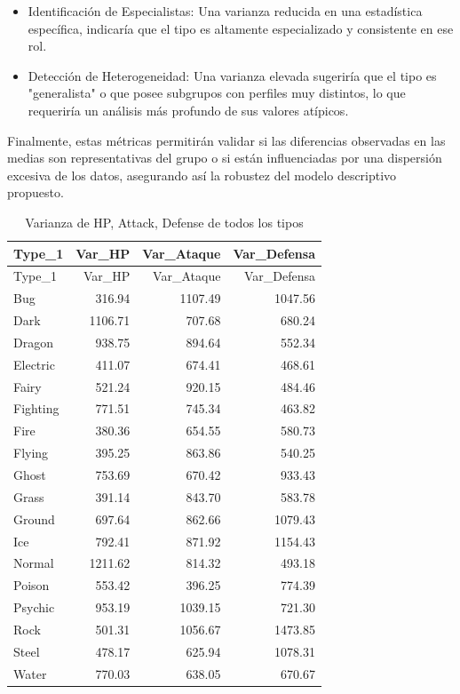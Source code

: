 \documentclass[oneside,11pt]{Latex/Classes/PhDthesisPSnPDF}
\begin{document}
\begin{itemize}

 \item{Identificación de Especialistas: Una varianza reducida en una estadística específica, indicaría que el tipo es altamente especializado y consistente en ese rol.}
 
\item{Detección de Heterogeneidad: Una varianza elevada sugeriría que el tipo es "generalista" o que posee subgrupos con perfiles muy distintos, lo que requeriría un análisis más profundo de sus valores atípicos.} 

\end{itemize}

Finalmente, estas métricas permitirán validar si las diferencias
observadas en las medias son representativas del grupo o si están
influenciadas por una dispersión excesiva de los datos, asegurando así
la robustez del modelo descriptivo propuesto.

\begin{longtable}[]{@{}lrrr@{}}
\caption{Varianza de HP, Attack, Defense de todos los
tipos}\tabularnewline
\toprule\noalign{}
Type\_1 & Var\_HP & Var\_Ataque & Var\_Defensa \\
\midrule\noalign{}
\endfirsthead
\toprule\noalign{}
Type\_1 & Var\_HP & Var\_Ataque & Var\_Defensa \\
\midrule\noalign{}
\endhead
\bottomrule\noalign{}
\endlastfoot
Bug & 316.94 & 1107.49 & 1047.56 \\
Dark & 1106.71 & 707.68 & 680.24 \\
Dragon & 938.75 & 894.64 & 552.34 \\
Electric & 411.07 & 674.41 & 468.61 \\
Fairy & 521.24 & 920.15 & 484.46 \\
Fighting & 771.51 & 745.34 & 463.82 \\
Fire & 380.36 & 654.55 & 580.73 \\
Flying & 395.25 & 863.86 & 540.25 \\
Ghost & 753.69 & 670.42 & 933.43 \\
Grass & 391.14 & 843.70 & 583.78 \\
Ground & 697.64 & 862.66 & 1079.43 \\
Ice & 792.41 & 871.92 & 1154.43 \\
Normal & 1211.62 & 814.32 & 493.18 \\
Poison & 553.42 & 396.25 & 774.39 \\
Psychic & 953.19 & 1039.15 & 721.30 \\
Rock & 501.31 & 1056.67 & 1473.85 \\
Steel & 478.17 & 625.94 & 1078.31 \\
Water & 770.03 & 638.05 & 670.67 \\
\end{longtable}
\end{document}
